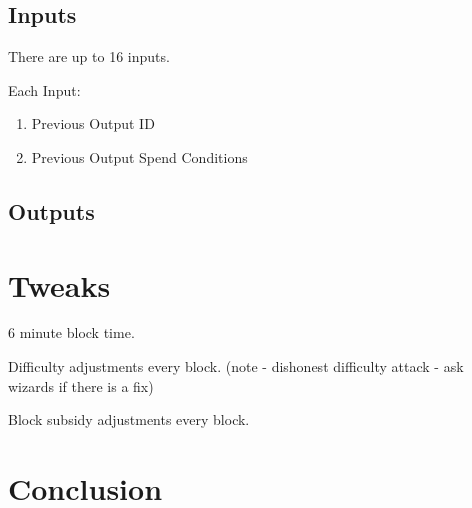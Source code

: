 \documentclass[twocolumn]{article}
\begin{document}
\subsection{Inputs}
There are up to 16 inputs.

Each Input:
\begin{enumerate}
    \item Previous Output ID
    \item Previous Output Spend Conditions
\end{enumerate}

\subsection{Outputs}

\section{Tweaks}
6 minute block time.

Difficulty adjustments every block. (note - dishonest difficulty attack - ask wizards if there is a fix)

Block subsidy adjustments every block.

\section{Conclusion}

\onecolumn
\begin{bibliography}{2}

\bibitem{}

\end{bibliography}
\end{document}
